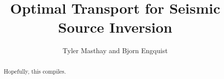 \author{Tyler Masthay and Bjorn Engquist}
\title{Optimal Transport for Seismic Source Inversion}

\maketitle

\begin{abstract}
Hopefully, this compiles.
\end{abstract}






